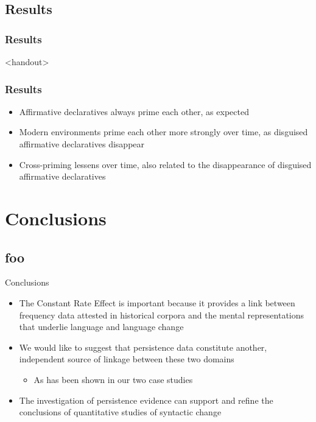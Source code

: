 \documentclass{digs-slides}
\newcommand{\includegraph}[2][]{\mode<beamer>{\texttt{[image: \#2]}}
    \mode<handout>{\texttt{[image: \#2]}}}
\begin{document}
\subsection{Results}
\label{sec:results}

\begin{frame}
    \frametitle{Results}
    \includegraph[width=\textwidth]{figures/do-results}
\end{frame}

\begin{frame}<handout>
    \frametitle{Results}
    \begin{itemize}
      \item Affirmative declaratives always prime each other, as expected
      \item Modern environments prime each other more strongly over
        time, as disguised affirmative declaratives disappear
      \item Cross-priming lessens over time, also related to the
        disappearance of disguised affirmative declaratives
    \end{itemize}
\end{frame}

\section{Conclusions}
\label{sec:conclusion}

\subsection*{foo}

\begin{frame}{Conclusions}
    \begin{itemize}
      \item The Constant Rate Effect is important because it
        provides a link between frequency data attested in historical
        corpora and the mental representations that underlie language
        and language change
      \item We would like to suggest that persistence data constitute
        another, independent source of linkage between these two domains
        \begin{itemize}
          \item As has been shown in our two case studies
        \end{itemize}
      \item The investigation of persistence evidence can support and refine
        the conclusions of quantitative studies of syntactic change
    \end{itemize}
\end{frame}
\end{document}

